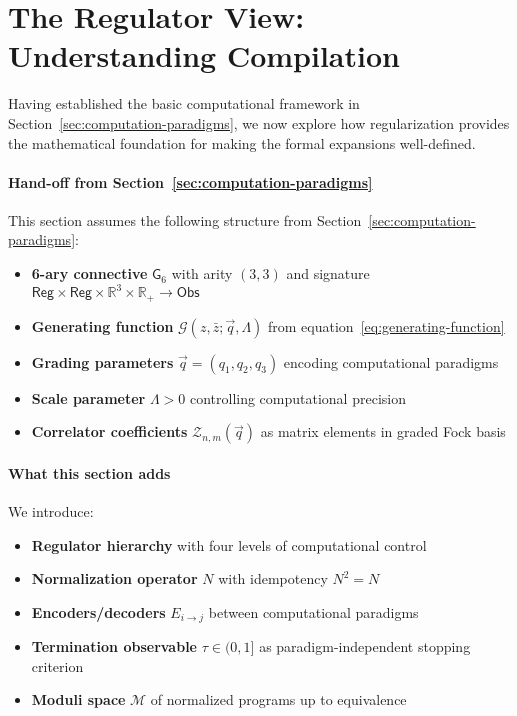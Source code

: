 \section{The Regulator View: Understanding Compilation}
\label{sec:regularization}

Having established the basic computational framework in Section~\ref{sec:computation-paradigms}, we now explore how regularization provides the mathematical foundation for making the formal expansions well-defined. 

\paragraph{Hand-off from Section~\ref{sec:computation-paradigms}}
This section assumes the following structure from Section~\ref{sec:computation-paradigms}:
\begin{itemize}
\item \textbf{6-ary connective} $\mathsf{G}_6$ with arity $(3,3)$ and signature $\mathsf{Reg} \times \mathsf{Reg} \times \mathbb{R}^3 \times \mathbb{R}_+ \to \mathsf{Obs}$
\item \textbf{Generating function} $\mathcal{G}(z,\bar{z};\vec{q},\Lambda)$ from equation~\eqref{eq:generating-function}
\item \textbf{Grading parameters} $\vec{q} = (q_1, q_2, q_3)$ encoding computational paradigms
\item \textbf{Scale parameter} $\Lambda > 0$ controlling computational precision
\item \textbf{Correlator coefficients} $\mathcal{Z}_{n,m}(\vec{q})$ as matrix elements in graded Fock basis
\end{itemize}

\paragraph{What this section adds}
We introduce:
\begin{itemize}
\item \textbf{Regulator hierarchy} with four levels of computational control
\item \textbf{Normalization operator} $N$ with idempotency $N^2 = N$
\item \textbf{Encoders/decoders} $E_{i\to j}$ between computational paradigms
\item \textbf{Termination observable} $\tau \in (0,1]$ as paradigm-independent stopping criterion
\item \textbf{Moduli space} $\mathcal{M}$ of normalized programs up to equivalence
\end{itemize}

